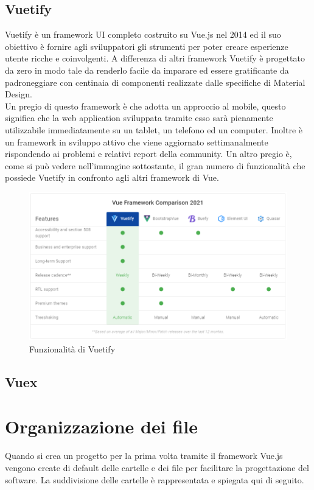 \subsection{Vuetify}
Vuetify è un framework UI completo costruito su Vue.js nel 2014 ed il suo obiettivo è fornire agli sviluppatori gli strumenti per poter creare esperienze utente ricche e coinvolgenti. A differenza di altri framework Vuetify è progettato da zero in modo tale da renderlo facile da imparare ed essere gratificante da padroneggiare con centinaia di componenti realizzate dalle specifiche di Material Design.\\
Un pregio di questo framework è che adotta un approccio al mobile, questo significa che la web application sviluppata tramite esso sarà pienamente utilizzabile immediatamente su un tablet, un telefono ed un computer. Inoltre è un framework in sviluppo attivo che viene aggiornato settimanalmente rispondendo ai problemi e relativi report della community. Un altro pregio è, come si può vedere nell'immagine sottostante, il gran numero di funzionalità che possiede Vuetify in confronto agli altri framework di Vue.
\begin{figure}[H]
	\begin{center}
		\includegraphics[width=1\columnwidth]{immagini/vuetify.png}
		\caption{Funzionalità di Vuetify}
	\end{center}
\end{figure}
\subsection{Vuex}

\section{Organizzazione dei file}
Quando si crea un progetto per la prima volta tramite il framework Vue.js vengono create di default delle cartelle e dei file per facilitare la progettazione del software. La suddivisione delle cartelle è rappresentata e spiegata qui di seguito.


